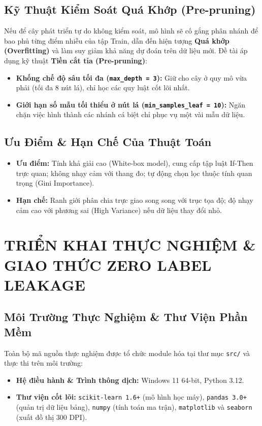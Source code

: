 \documentclass[12pt,a4paper]{article}
\begin{document}
\subsection{Kỹ Thuật Kiểm Soát Quá Khớp (Pre-pruning)}
Nếu để cây phát triển tự do không kiểm soát, mô hình sẽ cố gắng phân nhánh để bao phủ từng điểm nhiễu của tập Train, dẫn đến hiện tượng \textbf{Quá khớp (Overfitting)} và làm suy giảm khả năng dự đoán trên dữ liệu mới. Đề tài áp dụng kỹ thuật \textbf{Tiền cắt tỉa (Pre-pruning)}:
\begin{itemize}
    \item \textbf{Khống chế độ sâu tối đa (\texttt{max\_depth = 3}):} Giữ cho cây ở quy mô vừa phải (tối đa 8 nút lá), chỉ học các quy luật cốt lõi nhất.
    \item \textbf{Giới hạn số mẫu tối thiểu ở nút lá (\texttt{min\_samples\_leaf = 10}):} Ngăn chặn việc hình thành các nhánh cá biệt chỉ phục vụ một vài mẫu dữ liệu.
\end{itemize}

\subsection{Ưu Điểm \& Hạn Chế Của Thuật Toán}
\begin{itemize}
    \item \textbf{Ưu điểm:} Tính khả giải cao (White-box model), cung cấp tập luật If-Then trực quan; không nhạy cảm với thang đo; tự động chọn lọc thuộc tính quan trọng (Gini Importance).
    \item \textbf{Hạn chế:} Ranh giới phân chia trực giao song song với trục tọa độ; độ nhạy cảm cao với phương sai (High Variance) nếu dữ liệu thay đổi nhỏ.
\end{itemize}

\newpage
\section{TRIỂN KHAI THỰC NGHIỆM \& GIAO THỨC ZERO LABEL LEAKAGE}

\subsection{Môi Trường Thực Nghiệm \& Thư Viện Phần Mềm}
Toàn bộ mã nguồn thực nghiệm được tổ chức module hóa tại thư mục \texttt{src/} và thực thi trên môi trường:
\begin{itemize}
    \item \textbf{Hệ điều hành \& Trình thông dịch:} Windows 11 64-bit, Python 3.12.
    \item \textbf{Thư viện cốt lõi:} \texttt{scikit-learn 1.6+} (mô hình học máy), \texttt{pandas 3.0+} (quản trị dữ liệu bảng), \texttt{numpy} (tính toán ma trận), \texttt{matplotlib} và \texttt{seaborn} (xuất đồ thị 300 DPI).
\end{itemize}
\end{document}
